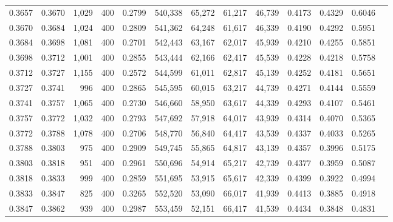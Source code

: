 \begin{tabular}{rrrrrrrrrrrrr}
0.3657 & 0.3670 &  1,029 &   400 &                                     0.2799 & 540,338 &  65,272 &  61,217 &  46,739 & 0.4173 & 0.4329 & 0.6046 \\
0.3670 & 0.3684 &  1,024 &   400 &                                     0.2809 & 541,362 &  64,248 &  61,617 &  46,339 & 0.4190 & 0.4292 & 0.5951 \\
0.3684 & 0.3698 &  1,081 &   400 &                                     0.2701 & 542,443 &  63,167 &  62,017 &  45,939 & 0.4210 & 0.4255 & 0.5851 \\
0.3698 & 0.3712 &  1,001 &   400 &                                     0.2855 & 543,444 &  62,166 &  62,417 &  45,539 & 0.4228 & 0.4218 & 0.5758 \\
0.3712 & 0.3727 &  1,155 &   400 &                                     0.2572 & 544,599 &  61,011 &  62,817 &  45,139 & 0.4252 & 0.4181 & 0.5651 \\
0.3727 & 0.3741 &    996 &   400 &                                     0.2865 & 545,595 &  60,015 &  63,217 &  44,739 & 0.4271 & 0.4144 & 0.5559 \\
0.3741 & 0.3757 &  1,065 &   400 &                                     0.2730 & 546,660 &  58,950 &  63,617 &  44,339 & 0.4293 & 0.4107 & 0.5461 \\
0.3757 & 0.3772 &  1,032 &   400 &                                     0.2793 & 547,692 &  57,918 &  64,017 &  43,939 & 0.4314 & 0.4070 & 0.5365 \\
0.3772 & 0.3788 &  1,078 &   400 &                                     0.2706 & 548,770 &  56,840 &  64,417 &  43,539 & 0.4337 & 0.4033 & 0.5265 \\
0.3788 & 0.3803 &    975 &   400 &                                     0.2909 & 549,745 &  55,865 &  64,817 &  43,139 & 0.4357 & 0.3996 & 0.5175 \\
0.3803 & 0.3818 &    951 &   400 &                                     0.2961 & 550,696 &  54,914 &  65,217 &  42,739 & 0.4377 & 0.3959 & 0.5087 \\
0.3818 & 0.3833 &    999 &   400 &                                     0.2859 & 551,695 &  53,915 &  65,617 &  42,339 & 0.4399 & 0.3922 & 0.4994 \\
0.3833 & 0.3847 &    825 &   400 &                                     0.3265 & 552,520 &  53,090 &  66,017 &  41,939 & 0.4413 & 0.3885 & 0.4918 \\
0.3847 & 0.3862 &    939 &   400 &                                     0.2987 & 553,459 &  52,151 &  66,417 &  41,539 & 0.4434 & 0.3848 & 0.4831 \\

\end{tabular}
